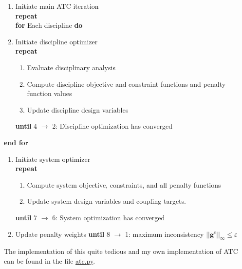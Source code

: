 \documentclass[11pt]{article}
\providecommand{\tightlist}{%
      \setlength{\itemsep}{0pt}\setlength{\parskip}{0pt}}
\begin{document}
\begin{enumerate}
\def\labelenumi{\arabic{enumi})}
\setcounter{enumi}{-1}
\item
  Initiate main ATC iteration\\
  \textbf{repeat}\\
  \textbf{for} Each discipline \textbf{do}
\item
  Initiate discipline optimizer\\
  \textbf{repeat}

  \begin{enumerate}
  \def\labelenumii{\arabic{enumii})}
  \setcounter{enumii}{1}
  \tightlist
  \item
    Evaluate disciplinary analysis
  \item
    Compute discipline objective and constraint functions and penalty
    function values
  \item
    Update discipline design variables
  \end{enumerate}

  \textbf{until} 4 \(\rightarrow\) 2: Discipline optimization has
  converged
\end{enumerate}

\textbf{end for}

\begin{enumerate}
\def\labelenumi{\arabic{enumi})}
\setcounter{enumi}{4}
\item
  Initiate system optimizer\\
  \textbf{repeat}

  \begin{enumerate}
  \def\labelenumii{\arabic{enumii})}
  \setcounter{enumii}{5}
  \tightlist
  \item
    Compute system objective, constraints, and all penalty functions
  \item
    Update system design variables and coupling targets.
  \end{enumerate}

  \textbf{until} 7 \(\rightarrow\) 6: System optimization has converged
\item
  Update penalty weights \textbf{until} 8 \(\rightarrow\) 1: maximum
  inconsistency
  \(\left|\left|\mathbf{g}^c\right|\right|_\infty \leq \varepsilon\)
\end{enumerate}

The implementation of this quite tedious and my own implementation of
ATC can be found in the file \url{atc.py}.
\end{document}
